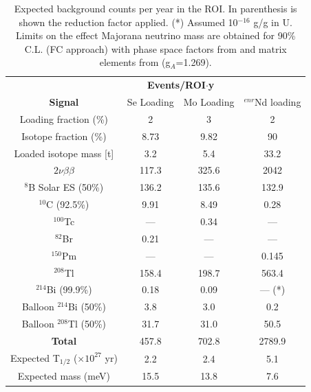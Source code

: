 \begin{table}
\centering
\begin{tabular}{cccc}
\toprule
                          & \multicolumn{2}{c}{\bf Events/ROI$\cdot$y} \\
{\bf Signal}              & Se Loading & Mo Loading  & $^{enr}$Nd loading\\
\midrule
Loading fraction (\%) & 2 & 3 & 2 \\
Isotope fraction (\%) & 8.73 & 9.82 & 90 \\
Loaded isotope mass [t] & 3.2 & 5.4 & 33.2 \\
\midrule
$2\nu\beta\beta$          & 117.3 &  325.6  & 2042     \\
$^8$B Solar ES  (50\%)           & 136.2     & 135.6 & 132.9      \\
$^{10}$C  (92.5\%)                & 9.91       & 8.49 & 0.28       \\
$^{100}$Tc \cite{eijiri14, eijiri17}                 & ---       & 0.34 & ---        \\
$^{82}$Br \cite{eijiri14, eijiri17}               & 0.21        & --- & ---        \\
$^{150}$Pm \cite{eijiri14, eijiri17}               & ---        & --- & 0.145       \\
$^{208}$Tl                & 158.4       & 198.7 & 563.4      \\
$^{214}$Bi  (99.9\%)               & 0.18        & 0.09 & --- (*)        \\
Balloon $^{214}$Bi  (50\%)       & 3.8       & 3.0 & 0.2       \\
Balloon $^{208}$Tl  (50\%)      & 31.7       & 31.0 & 50.5       \\
\midrule
{\bf Total}               & 457.8      & 702.8 & 2789.9      \\ \hline \hline
Expected T$_{1/2}$ ($\times10^{27}$ yr) & 2.2 & 2.4 & 5.1 \\
Expected mass (meV) & 15.5 & 13.8 & 7.6 \\ \hline
\bottomrule
\end{tabular}
\caption{Expected background counts per year in the ROI. In parenthesis is shown the reduction factor applied. (*) Assumed 10$^{-16}$ g/g in U. Limits on the effect Majorana neutrino mass are obtained for 90\% C.L. (FC approach) with phase space factors from \cite{2012PhRvC..85c4316K} and matrix elements from \cite{Barea:2013wb} (g$_{A}$=1.269).}
\label{table::dbd::alternatives}
\end{table}

